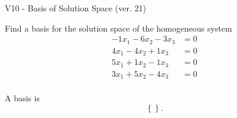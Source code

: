 \begin{exercise}
  \begin{exerciseTitle}V10 - Basis of Solution Space (ver. 21)\end{exerciseTitle}
  \begin{exerciseStatement}
    Find a basis for the solution space of the homogeneous system 
\begin{align*}
 -1 x_ 1 -6 x_ 2 -3 x_ 3 &= 0  \\ 
  4 x_ 1 -4 x_ 2 + 1 x_ 3 &= 0  \\ 
  5 x_ 1 + 1 x_ 2 -1 x_ 3 &= 0  \\ 
  3 x_ 1 + 5 x_ 2 -4 x_ 3 &= 0  \\ 
 \end{align*}


 
  \end{exerciseStatement}

  \begin{exerciseAnswer}
   A basis is   
\[\left\{\right\}.\]

  


  \end{exerciseAnswer}
\end{exercise}